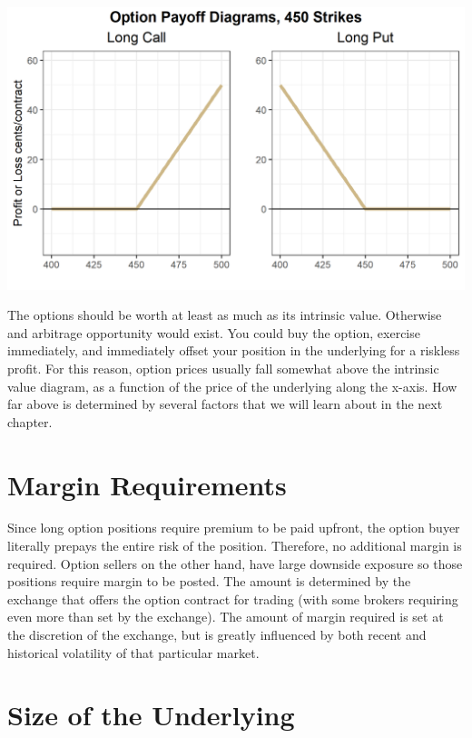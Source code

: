 \documentclass[
]{book}
\begin{document}
\includegraphics{assets/Options1-optionintrinsic.png}

The options should be worth at least as much as its intrinsic value. Otherwise and arbitrage opportunity would exist. You could buy the option, exercise immediately, and immediately offset your position in the underlying for a riskless profit. For this reason, option prices usually fall somewhat above the intrinsic value diagram, as a function of the price of the underlying along the x-axis. How far above is determined by several factors that we will learn about in the next chapter.

\hypertarget{margin-requirements}{%
\section{Margin Requirements}\label{margin-requirements}}

Since long option positions require premium to be paid upfront, the option buyer literally prepays the entire risk of the position. Therefore, no additional margin is required. Option sellers on the other hand, have large downside exposure so those positions require margin to be posted. The amount is determined by the exchange that offers the option contract for trading (with some brokers requiring even more than set by the exchange). The amount of margin required is set at the discretion of the exchange, but is greatly influenced by both recent and historical volatility of that particular market.

\hypertarget{size-of-the-underlying}{%
\section{Size of the Underlying}\label{size-of-the-underlying}}
\end{document}
